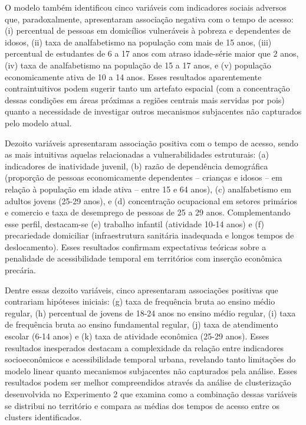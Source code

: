O modelo também identificou cinco variáveis com indicadores sociais adversos que, paradoxalmente, apresentaram associação negativa com o tempo de acesso: (i) percentual de pessoas em domicílios vulneráveis à pobreza e dependentes de idosos, (ii) taxa de analfabetismo na população com mais de 15 anos, (iii) percentual de estudantes de 6 a 17 anos com atraso idade-série maior que 2 anos, (iv) taxa de analfabetismo na população de 15 a 17 anos, e (v) população economicamente ativa de 10 a 14 anos. Esses resultados aparentemente contraintuitivos podem sugerir tanto um artefato espacial (com a concentração dessas condições em áreas próximas a regiões centrais mais servidas por \ac{pois}) quanto a necessidade de investigar outros mecanismos subjacentes não capturados pelo modelo atual.

Dezoito variáveis apresentaram associação positiva com o tempo de acesso, sendo as mais intuitivas aquelas relacionadas a vulnerabilidades estruturais: (a) indicadores de inatividade juvenil, (b) razão de dependência demográfica (proporção de pessoas economicamente dependentes – crianças e idosos – em relação à população em idade ativa – entre 15 e 64 anos), (c) analfabetismo em adultos jovens (25-29 anos), e (d) concentração ocupacional em setores primários e comercio e taxa de desemprego de pessoas de 25 a 29 anos. Complementando esse perfil, destacam-se (e) trabalho infantil (atividade 10-14 anos) e (f) precariedade domiciliar (infraestrutura sanitária inadequada e longos tempos de deslocamento). Esses resultados confirmam expectativas teóricas sobre a penalidade de acessibilidade temporal em territórios com inserção econômica precária. 

Dentre essas dezoito variáveis, cinco apresentaram associações positivas que contrariam hipóteses iniciais: (g) taxa de frequência bruta ao ensino médio regular, (h) percentual de jovens de 18-24 anos no ensino médio regular, (i) taxa de frequência bruta ao ensino fundamental regular, (j) taxa de atendimento escolar (6-14 anos) e (k) taxa de atividade econômica (25-29 anos). Esses resultados inesperados destacam a complexidade da relação entre indicadores socioeconômicos e acessibilidade temporal urbana, revelando tanto limitações do modelo linear quanto mecanismos subjacentes não capturados pela análise. Esses resultados podem ser melhor compreendidos através da análise de clusterização desenvolvida no Experimento 2 que examina como a combinação dessas variáveis se distribui no território e compara as médias dos tempos de acesso entre os clusters identificados.

